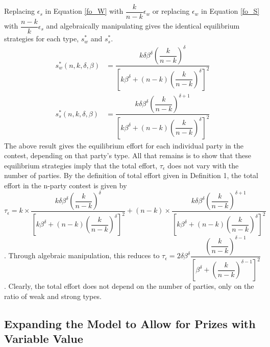 \documentclass[12pt]{article}
\begin{document}
\begin{appendix}
Replacing $\epsilon_s$ in Equation \ref{fo_W} with $\dfrac{k}{n-k}\epsilon_w$ or replacing $\epsilon_w$ in Equation \ref{fo_S} with $\dfrac{n-k}{k}\epsilon_s$ and algebraically manipulating gives the identical equilibrium strategies for each type, $s^*_w$ and $s^*_s$.
\begin{align}
s^*_w(n, k, \delta, \beta) &= \dfrac{k\delta\beta^\delta(\dfrac{k}{n-k})^\delta}{[k\beta^\delta + (n-k)(\dfrac{k}{n-k})^\delta]^2} \\
s^*_s(n, k, \delta, \beta) &= \dfrac{k\delta\beta^\delta(\dfrac{k}{n-k})^{\delta+1}}{[k\beta^\delta + (n-k)(\dfrac{k}{n-k})^\delta]^2}
\end{align}
The above result gives the equilibrium effort for each individual party in the contest, depending on that party's type. All that remains is to show that these equilibrium strategies imply that the total effort, $\tau_\epsilon$ does not vary with the number of parties. By the definition of total effort given in Definition 1, the total effort in the n-party contest is given by $\tau_\epsilon = k \times \dfrac{k\delta\beta^\delta(\dfrac{k}{n-k})^\delta}{[k\beta^\delta + (n-k)(\dfrac{k}{n-k})^\delta]^2} + (n - k) \times \dfrac{k\delta\beta^\delta(\dfrac{k}{n-k})^{\delta+1}}{[k\beta^\delta + (n-k)(\dfrac{k}{n-k})^\delta]^2}$. Through algebraic manipulation, this reduces to $\tau_\epsilon = 2\delta\beta^\delta\dfrac{(\dfrac{k}{n-k})^{\delta - 1}}{[\beta^\delta + (\dfrac{k}{n-k})^{\delta-1}]^2}$. Clearly, the total effort does not depend on the number of parties, only on the ratio of weak and strong types.

\subsection{Expanding the Model to Allow for Prizes with Variable Value}\label{app:variable-prize}


\end{appendix}
\end{document}
